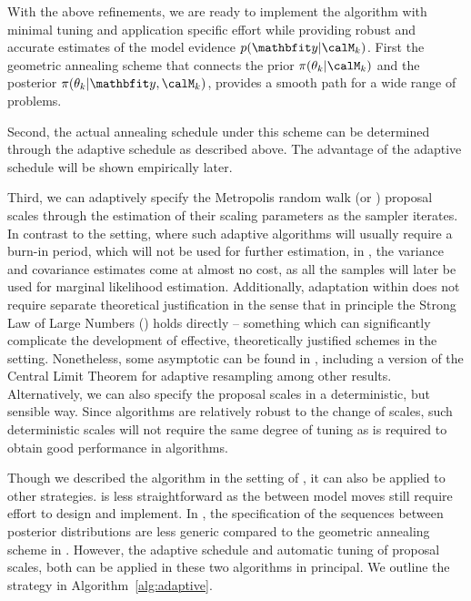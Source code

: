 With the above refinements, we are ready to implement the \smc[2] algorithm
with minimal tuning and application specific effort while providing robust and
accurate estimates of the model evidence $p(\data|\calM_k)$. First the
geometric annealing scheme that connects the prior $\pi(\theta_k|\calM_k)$ and
the posterior $\pi(\theta_k|\data,\calM_k)$, provides a smooth path for a wide
range of problems.

Second, the actual annealing schedule under this scheme can be determined
through the adaptive schedule as described above. The advantage of the
adaptive schedule will be shown empirically later.

Third, we can adaptively specify the Metropolis random walk (or \mala)
proposal scales through the estimation of their scaling parameters as the
sampler iterates. In contrast to the \mcmc setting, where such adaptive
algorithms will usually require a burn-in period, which will not be used for
further estimation, in \smc, the variance and covariance estimates come at
almost no cost, as all the samples will later be used for marginal likelihood
estimation. Additionally, adaptation within \smc does not require separate
theoretical justification in the sense that in principle the Strong Law of
Large Numbers (\slln) holds directly -- something which can significantly
complicate the development of effective, theoretically justified schemes in
the \mcmc setting. Nonetheless, some asymptotic can be found in
\cite{Beskos:2013vx}, including a version of the Central Limit Theorem for
adaptive resampling among other results. Alternatively, we can also specify
the proposal scales in a deterministic, but sensible way. Since \smc
algorithms are relatively robust to the change of scales, such deterministic
scales will not require the same degree of tuning as is required to obtain
good performance in \mcmc algorithms.

Though we described the algorithm in the setting of \smc[2], it can also be
applied to other \smc strategies. \smc[1] is less straightforward as the
between model moves still require effort to design and implement. In \smc[3],
the specification of the sequences between posterior distributions are less
generic compared to the geometric annealing scheme in \smc[2]. However, the
adaptive schedule and automatic tuning of \mcmc proposal scales, both can be
applied in these two algorithms in principal. We outline the strategy in
Algorithm~\ref{alg:adaptive}.



